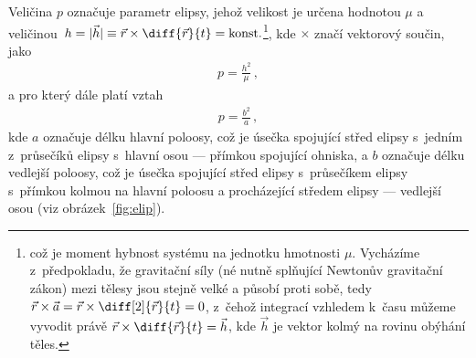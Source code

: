 \documentclass[A4paper, 12pt, oneside]{book}%
\begin{document}
Veličina $p$ označuje parametr elipsy, jehož velikost je určena hodnotou $\mu$ a veličinou~$h=|\vec{h}| \equiv \vec{r}\times\diff{\vec{r}}{t}={\rm konst.}$\footnote{což je  moment hybnost systému na jednotku hmotnosti $\mu$. Vycházíme z~předpokladu, že gravitační síly (né nutně splňující Newtonův gravitační zákon) mezi tělesy jsou stejně velké a působí proti sobě, tedy $\vec{r}\times\vec{a}=\vec{r}\times\diff[2]{\vec{r}}{t}=0$, z~čehož integrací vzhledem k~času můžeme vyvodit právě $\vec{r}\times\diff{\vec{r}}{t}=\vec{h}$, kde $\vec{h}$ je vektor kolmý na rovinu obýhání těles.}, kde $\times$ značí vektorový součin, jako
\begin{align}
	p=\frac{h^2}{\mu}\,,
\end{align}
a pro který dále platí vztah
\begin{align}
	p=\frac{b^2}{a}\,,
\end{align}
kde $a$ označuje délku hlavní poloosy, což je úsečka spojující střed elipsy s~jedním z~průsečíků elipsy s~hlavní osou --- přímkou spojující ohniska, a $b$ označuje délku vedlejší poloosy, což je úsečka spojující střed elipsy s~průsečíkem elipsy s~přímkou kolmou na hlavní poloosu a procházející středem elipsy --- vedlejší osou (viz obrázek~\ref{fig:elip}).
\end{document}
